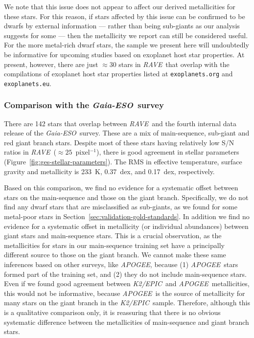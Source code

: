 \documentclass[preprint,trackchanges]{aastex}
\newcommand{\acronym}[1]{{\small{#1}}}
\newcommand{\project}[1]{\textsl{#1}}
\newcommand{\rave}{\project{\acronym{RAVE}}}
\newcommand{\ges}{\project{Gaia-ESO}}
\newcommand{\apogee}{\project{\acronym{APOGEE}}}
\newcommand{\epic}{\project{K2/EPIC}}
\begin{document}
We note that this issue does not appear to affect our derived metallicities for these
stars.  For this reason, if stars affected by this issue can be confirmed to be
dwarfs by external information --- rather than being sub-giants as our analysis
suggests for some --- then the metallicity we report can still be considered
useful.  For the more metal-rich dwarf stars, the sample we present here
will undoubtedly be informative for upcoming studies based on exoplanet host
star properties.  At present, however, there are just $\approx$30 stars in 
\rave\ that overlap with the compilations of exoplanet host star properties 
listed at \texttt{exoplanets.org} and \texttt{exoplanets.eu}.



\subsubsection{Comparison with the \ges\ survey}
\label{sec:validation-ges}

There are 142 stars that overlap between \rave\ and the fourth internal
data release of the \ges\ survey. These are a mix of main-sequence, 
sub-giant and red giant branch stars.  Despite most of these stars having
relatively low S/N ratios in \rave\ ($\approx 25$~pixel$^{-1}$), there is good 
agreement in stellar parameters (Figure~\ref{fig:ges-stellar-parameters}).  
The RMS in effective temperature, surface gravity and metallicity is
233~K, 0.37~dex, and 0.17~dex, respectively.  


Based on this comparison, we find no evidence for a systematic offset 
between stars on the main-sequence and those on the giant branch. Specifically,
we do not find any dwarf stars that are misclassified as sub-giants, as we
found for some metal-poor stars in Section~\ref{sec:validation-gold-standards}.
In addition we find no evidence for a systematic offset in metallicity (or
individual abundances) between giant stars and main-sequence stars.  This is
a crucial observation, as the metallicities for stars in our main-sequence
training set have a principally different source to those on the giant branch.
We cannot make these same inferences based on other surveys, like \apogee,
because (1) \apogee\ stars formed part of the training set, and (2) they do
not include main-sequence stars.  Even if we found good agreement between
\epic\ and \apogee\ metallicities, this would not be informative, because
\apogee\ is the source of metallicity for many stars on the giant branch in
the \epic\ sample. Therefore, although this is a qualitative comparison only,
it is reassuring that there is no obvious systematic difference between the
metallicities of main-sequence and giant branch stars.
\end{document}
